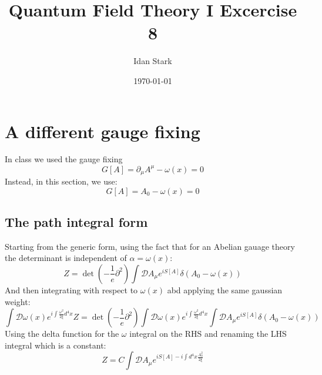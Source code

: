\documentclass{article}
\title{Quantum Field Theory I Excercise 8}
\author{Idan Stark}
\date{\today}
\begin{document}
\maketitle

\section{A different gauge fixing}
In class we used the gauge fixing
\begin{equation}
    G[A] = \partial_\mu A^\mu - \omega(x) = 0
\end{equation}
Instead, in this section, we use:
\begin{equation}
    G[A] = A_0 - \omega(x) = 0
\end{equation}

\subsection{The path integral form}
Starting from the generic form, using the fact that for an Abelian gauage theory the determinant is independent of $\alpha = \omega(x)$:
\begin{equation}
    Z = \det(-\frac{1}{e}\partial^2) \int \mathcal{D}A_\mu e^{iS[A]}\delta(A_0 - \omega(x))
\end{equation}
And then integrating with respect to $\omega(x)$ abd applying the same gaussian weight:
\begin{equation}
    \int \mathcal{D} \omega(x) e^{i \int \frac{\omega^2}{2\xi} d^4x} Z = \det(-\frac{1}{e}\partial^2)\int \mathcal{D} \omega(x) e^{i \int \frac{\omega^2}{2\xi} d^4x} \int \mathcal{D}A_\mu e^{iS[A]}\delta(A_0 - \omega(x))
\end{equation}
Using the delta function for the $\omega$ integral on the RHS and renaming the LHS integral which is a constant:
\begin{equation}
    Z = C \int \mathcal{D} A_\mu e^{iS[A] - i \int d^4x \frac{A_0^2}{2\xi}}
\end{equation}
\end{document}
